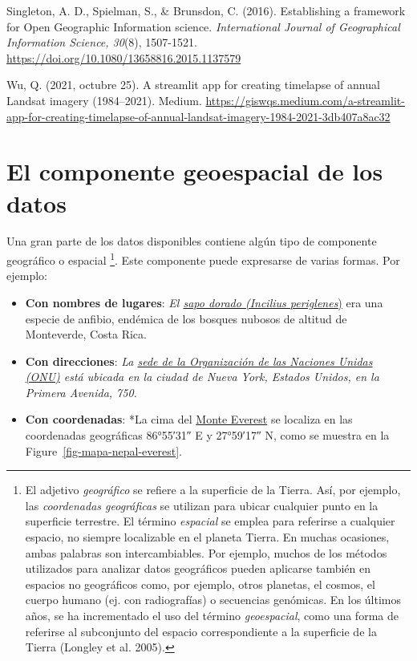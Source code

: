 \documentclass[
  letterpaper,
  DIV=11,
  numbers=noendperiod]{scrreprt}
\providecommand{\tightlist}{%
  \setlength{\itemsep}{0pt}\setlength{\parskip}{0pt}}\usepackage{longtable,booktabs,array}
\begin{document}
Singleton, A. D., Spielman, S., \& Brunsdon, C. (2016). Establishing a
framework for Open Geographic Information science. \emph{International
Journal of Geographical Information Science, 30}(8), 1507-1521.
\url{https://doi.org/10.1080/13658816.2015.1137579}

Wu, Q. (2021, octubre 25). A streamlit app for creating timelapse of
annual Landsat imagery (1984--2021). Medium.
\url{https://giswqs.medium.com/a-streamlit-app-for-creating-timelapse-of-annual-landsat-imagery-1984-2021-3db407a8ac32}

\hypertarget{el-componente-geoespacial-de-los-datos}{%
\section{El componente geoespacial de los
datos}\label{el-componente-geoespacial-de-los-datos}}

Una gran parte de los datos disponibles contiene algún tipo de
componente geográfico o espacial \footnote{El adjetivo \emph{geográfico}
  se refiere a la superficie de la Tierra. Así, por ejemplo, las
  \emph{coordenadas geográficas} se utilizan para ubicar cualquier punto
  en la superficie terrestre. El término \emph{espacial} se emplea para
  referirse a cualquier espacio, no siempre localizable en el planeta
  Tierra. En muchas ocasiones, ambas palabras son intercambiables. Por
  ejemplo, muchos de los métodos utilizados para analizar datos
  geográficos pueden aplicarse también en espacios no geográficos como,
  por ejemplo, otros planetas, el cosmos, el cuerpo humano (ej. con
  radiografías) o secuencias genómicas. En los últimos años, se ha
  incrementado el uso del término \emph{geoespacial}, como una forma de
  referirse al subconjunto del espacio correspondiente a la superficie
  de la Tierra (Longley et al. 2005).}. Este componente puede expresarse
de varias formas. Por ejemplo:

\begin{itemize}
\tightlist
\item
  \textbf{Con nombres de lugares}: \emph{El
  \href{https://es.wikipedia.org/wiki/Incilius_periglenes}{sapo dorado
  (Incilius
  periglenes}}\href{https://es.wikipedia.org/wiki/Incilius_periglenes}{)}
  era una especie de anfibio, endémica de los bosques nubosos de altitud
  de Monteverde, Costa Rica.
\item
  \textbf{Con direcciones}: \emph{La
  \href{https://es.wikipedia.org/wiki/Sede_de_la_Organizaci\%C3\%B3n_de_las_Naciones_Unidas}{sede
  de la Organización de las Naciones Unidas (ONU)} está ubicada en la
  ciudad de Nueva York, Estados Unidos, en la Primera Avenida, 750.}
\item
  \textbf{Con coordenadas}: *La cima del
  \href{https://es.wikipedia.org/wiki/Monte_Everest}{Monte Everest} se
  localiza en las coordenadas geográficas 86°55′31″ E y 27°59′17″ N,
  como se muestra en la Figure~\ref{fig-mapa-nepal-everest}.
\end{itemize}
\end{document}
